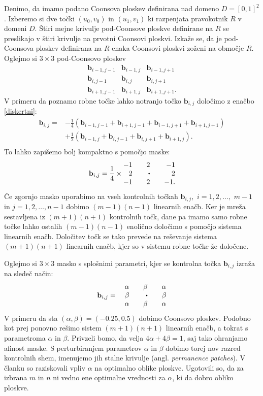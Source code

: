\documentclass[a4paper,12pt]{article}
\begin{document}
Denimo, da imamo podano Coonsova ploskev definirana nad domeno $D = [0,1]^2$. 
Izberemo si dve točki $(u_0,v_0)$ in $(u_1,v_1)$ ki razpenjata pravokotnik $R$ v domeni $D$. 
Štiri mejne krivulje pod-Coonsove ploskve definirane na $R$ se preslikajo 
v štiri krivulje na prvotni Coonsovi ploskvi. Izkaže se, da je pod-Coonsova ploskev 
definirana na $R$ enaka Coonsovi ploskvi zoženi na območje $R$. 
Oglejmo si $3 \times 3$ pod-Coonsovo ploskev
$$
\begin{matrix} 
   \mathbf{b}_{i-1,j-1} & \mathbf{b}_{i-1,j} & \mathbf{b}_{i-1,j+1}\\
   \mathbf{b}_{i,j-1} & \mathbf{b}_{i,j} & \mathbf{b}_{i,j+1}\\
   \mathbf{b}_{i+1,j-1} & \mathbf{b}_{i+1,j} & \mathbf{b}_{i+1,j+1}.
\end{matrix}
$$ 
V primeru da poznamo robne točke lahko notranjo točko $\mathbf{b}_{i,j}$
določimo z enačbo \eqref{diskertni}:  
\begin{align*}
   \mathbf{b}_{i,j} =& -\frac{1}{4}(\mathbf{b}_{i-1,j-1} + \mathbf{b}_{i+1,j-1} +
      \mathbf{b}_{i-1,j+1} + \mathbf{b}_{i+1,j+1}) \\
      &+\frac{1}{2}(\mathbf{b}_{i-1,j} + \mathbf{b}_{i,j-1}+
      \mathbf{b}_{i,j+1} + \mathbf{b}_{i+1,j}).\\
\end{align*}
To lahko zapišemo bolj kompaktno s pomočjo maske:
$$
\mathbf{b}_{i,j} = \frac{1}{4} \times 
\begin{matrix*}[r]
-1 && 2 && -1 \\
2 && \sbullet && 2\\
-1 && 2 && -1.
\end{matrix*}
$$
Če zgornjo masko uporabimo na vseh kontrolnih točkah 
$\mathbf{b}_{i,j},$ $i = 1,2,\dots,$ $m-1$ in $j = 1,2,\dots,n-1$
dobimo $(m-1)(n-1)$ linearnih enačb.
Ker je mreža sestavljena iz $(m+1)(n+1)$ kontrolnih točk, dane pa imamo samo robne
točke lahko ostalih $(m-1)(n-1)$ enolično določimo s pomočjo sistema
linearnih enačb. Določitev točk se tako prevede
na reševanje sistema $(m+1)(n+1)$ linearnih enačb, kjer so v sistemu robne točke že določene.

Oglejmo si $3 \times 3$ masko s splošnimi parametri, kjer se  kontrolna točka 
$\mathbf{b}_{i,j}$ izraža na sledeč način:
$$
\mathbf{b}_{i,j} =  \quad 
\begin{matrix*}[r]
\alpha && \beta && \alpha \\
\beta && \sbullet && \beta \\
\alpha && \beta && \alpha
\end{matrix*}
$$
V primeru da sta $(\alpha, \beta) = (-0.25, 0.5)$ dobimo Coonsovo
ploskev. 
Podobno kot prej ponovno rešimo sistem $(m+1)(n+1)$ linearnih enačb, a tokrat
s parametroma $\alpha$ in $\beta$.
Privzeli bomo, da velja $4\alpha + 4\beta = 1$, saj 
tako ohranjamo afinost maske. 
S perturbiranjem parametrov 
$\alpha$ in $\beta$ dobimo torej nov razred kontrolnih shem, imenujemo jih stalne 
krivulje (angl. \textit{permanence patches}). V članku \cite{DCP}  so raziskovali
vpliv $\alpha$ na optimalno oblike ploskve. Ugotovili so, da za izbrana $m$ in $n$
ni vedno ene optimalne vrednosti za $\alpha$, ki da dobro obliko ploskve.
\end{document}

